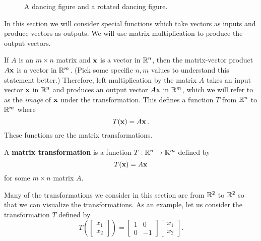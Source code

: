 \begin{figure}[ht]
\begin{center}
\caption{A dancing figure and a rotated dancing figure.}
\label{F:Rotate_dance}
\end{center}
\end{figure}

\label{sec:mtx_trans_intro}

In this section we will consider special functions which take vectors as inputs and produce vectors as outputs. We will use matrix multiplication to produce the output vectors.

If $A$ is an $m \times n$ matrix and $\mathbf{x}$ is a vector in $\mathbb{R}^n$, then the matrix-vector product $A \mathbf{x}$ is a vector in $\mathbb{R}^m$. (Pick some specific $n, m$ values to understand this statement better.) Therefore, left multiplication by the matrix $A$ takes an input vector $\mathbf{x}$ in $\mathbb{R}^n$ and produces an output vector $A\mathbf{x}$ in $\mathbb{R}^m$, which we will refer to as the \emph{image} of $\mathbf{x}$ under the transformation. This defines a function $T$ from $\mathbb{R}^n$ to $\mathbb{R}^m$ where
\[ T(\mathbf{x}) = A \mathbf{x} \, .\]
These functions are the matrix transformations. 

\begin{definition} A \textbf{matrix transformation} is a function $T: \mathbb{R}^n \to \mathbb{R}^m$ defined by 
\[T(\mathbf{x}) = A\mathbf{x}\]
for some $m \times n$ matrix $A$. 
\end{definition}

Many of the transformations we consider in this section are from $\mathbb{R}^2$ to $\mathbb{R}^2$ so that we can visualize the transformations.  As an example, let us consider the transformation $T$ defined by 
\[T\left(\left[ \begin{array}{c} x_1 \\ x_2 \end{array} \right] \right) = \left[ \begin{array}{cr} 1&0 \\ 0&-1 \end{array} \right]\left[ \begin{array}{c} x_1 \\ x_2 \end{array} \right]. \]

